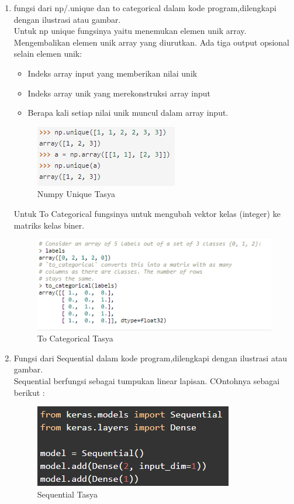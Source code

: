 \begin{enumerate}
\item fungsi dari np/.unique dan to categorical dalam kode program,dilengkapi dengan ilustrasi atau gambar.\\
Untuk np unique fungsinya yaitu menemukan elemen unik array. Mengembalikan elemen unik array yang diurutkan. Ada tiga output opsional selain elemen unik:\\
\begin{itemize}
\item Indeks array input yang memberikan nilai unik
\item Indeks array unik yang merekonstruksi array input
\item Berapa kali setiap nilai unik muncul dalam array input.
\end{itemize}
\begin{figure}[ht]
\centering
\includegraphics[scale=0.5]{figures/chapter6tasya4.png}
\caption{Numpy Unique Tasya}
\label{Teori}
\end{figure}

Untuk  To Categorical fungsinya untuk mengubah vektor kelas (integer) ke matriks kelas biner.
\begin{figure}[ht]
\centering
\includegraphics[scale=0.5]{figures/chapter6tasya5.png}
\caption{To Categorical Tasya}
\label{Teori}
\end{figure}

\item Fungsi dari Sequential dalam kode program,dilengkapi dengan ilustrasi atau gambar.\\
Sequential berfungsi sebagai tumpukan linear lapisan. COntohnya sebagai berikut :
\begin{figure}[ht]
\centering
\includegraphics[scale=0.5]{figures/chapter6tasya6.png}
\caption{Sequential Tasya}
\label{Teori}
\end{figure}
\end{enumerate}


